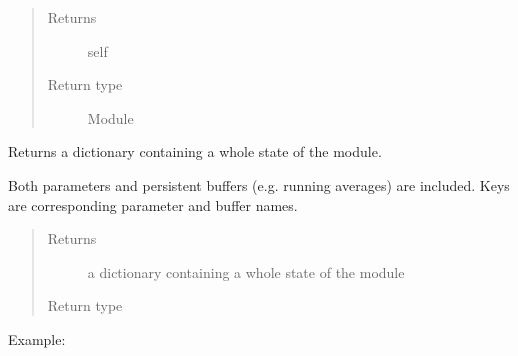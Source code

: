 \documentclass[letterpaper,10pt,english]{sphinxmanual}
\begin{document}
\begin{fulllineitems}
\begin{fulllineitems}
\begin{quote}
\begin{description}
\item[{Returns}] \leavevmode
self

\item[{Return type}] \leavevmode
Module

\end{description}\end{quote}

\end{fulllineitems}


\begin{fulllineitems}
\label{\detokenize{api/dynamics:geology.metamodelling.dynamics.LatentSpaceDynamics.share_memory}}
\end{fulllineitems}


\begin{fulllineitems}
\label{\detokenize{api/dynamics:geology.metamodelling.dynamics.LatentSpaceDynamics.state_dict}}
Returns a dictionary containing a whole state of the module.

Both parameters and persistent buffers (e.g. running averages) are
included. Keys are corresponding parameter and buffer names.
\begin{quote}\begin{description}
\item[{Returns}] \leavevmode
a dictionary containing a whole state of the module

\item[{Return type}] \leavevmode
{}

\end{description}\end{quote}

Example:

\begin{sphinxVerbatim}[commandchars=\\\{\}]
\end{sphinxVerbatim}


\end{fulllineitems}
\end{fulllineitems}
\end{document}
